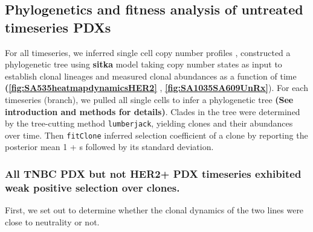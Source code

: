 \subsection{Phylogenetics and fitness analysis of untreated timeseries PDXs}
 For all timeseries, we inferred single cell copy number profiles , constructed a phylogenetic tree using \textbf{sitka} model taking copy number states as input to establish clonal lineages and measured clonal abundances as a function of time \textbf{(\autoref{fig:SA535heatmapdynamicsHER2} }, \textbf{\autoref{fig:SA1035SA609UnRx}}). For each timeseries (branch), we pulled all single cells to infer a phylogenetic tree \textbf{(See introduction and methods for details)}. Clades in the tree were determined by the tree-cutting method \texttt{lumberjack}, yielding clones and their abundances over time. Then \texttt{fitClone} inferred selection coefficient of a clone by reporting the posterior mean 1 + s followed by its standard deviation.

\subsubsection{All TNBC PDX but not HER2+ PDX timeseries exhibited weak positive selection over clones.}
First, we set out to determine whether the clonal dynamics of the two lines were close to neutrality or not.


